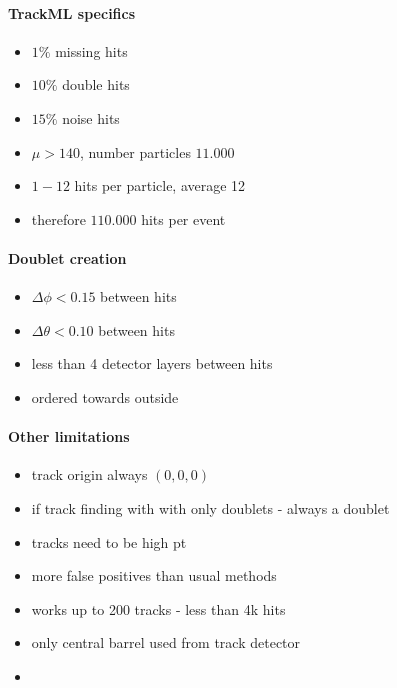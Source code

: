 \paragraph{TrackML specifics}
\begin{itemize}
  \item $1\%$ missing hits
  \item $10\%$ double hits
  \item $15\%$ noise hits
  \item $\mu>140$, number particles $11.000$
  \item $1-12$ hits per particle, average 12
  \item therefore $110.000$ hits per event
\end{itemize}
\paragraph{Doublet creation}
\begin{itemize}
  \item $\Delta\phi<0.15$ between hits
  \item $\Delta\theta<0.10$ between hits
  \item less than 4 detector layers between hits
  \item ordered towards outside
\end{itemize}

\paragraph{Other limitations}
\begin{itemize}
  \item track origin always $(0,0,0)$
  \item if track finding with with only doublets - always a doublet
  \item tracks need to be high pt
  \item more false positives than usual methods
  \item works up to 200 tracks - less than 4k hits
  \item only central barrel used from track detector
  \item 
\end{itemize}

